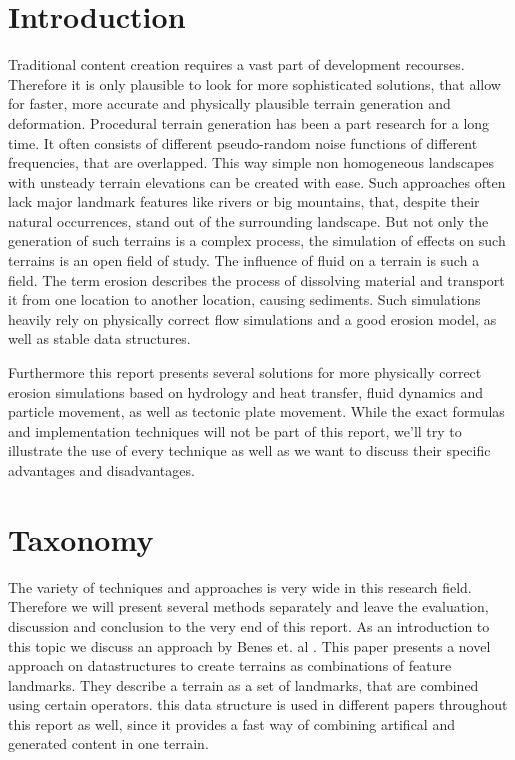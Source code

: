\section{Introduction}
Traditional content creation requires a vast part of development recourses. Therefore it is only plausible to look for more sophisticated solutions, that allow for faster, more accurate and physically plausible terrain generation and deformation. Procedural terrain generation has been a part research for a long time. It often consists of different pseudo-random noise functions of different frequencies, that are overlapped. This way simple non homogeneous landscapes with unsteady terrain elevations can be created with ease. Such approaches often lack major landmark features like rivers or big mountains, that, despite their natural occurrences, stand out of the surrounding landscape. But not only the generation of such terrains is a complex process, the simulation of effects on such terrains is an open field of study. The influence of fluid on a terrain is such a field. The term erosion describes the process of dissolving material and transport it from one location to another location, causing sediments. Such simulations heavily rely on physically correct flow simulations and a good erosion model, as well as stable data structures. 

Furthermore this report presents several solutions for more physically correct erosion simulations based on hydrology and heat transfer, fluid dynamics and particle movement, as well as tectonic plate movement. While the exact formulas  and implementation techniques will not be part of this report, we'll try to illustrate the use of every technique as well as we want to discuss their specific advantages and disadvantages.


\section{Taxonomy}

The variety of techniques and approaches is very wide in this research field. Therefore we will present several methods separately and leave the evaluation, discussion and conclusion to the very end of this report. As an introduction to this topic we discuss an approach by Benes et. al \cite{CGF:CGF12530}. This paper presents a novel approach on datastructures to create terrains as combinations of feature landmarks. They describe a terrain as a set of landmarks, that are combined using certain operators. this data structure is used in different papers throughout this report as well, since it provides a fast way of combining artifical and generated content in one terrain. 

